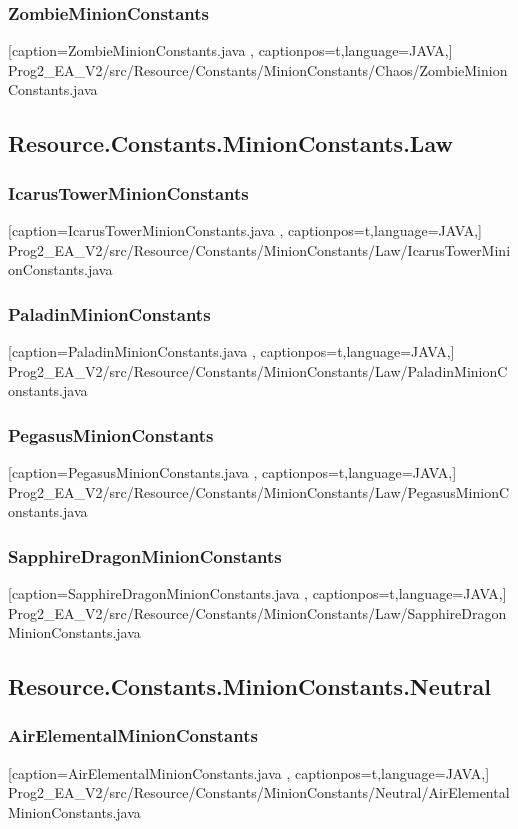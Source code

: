 \documentclass[a4paper,12pt]{scrartcl}
\begin{document}
	\subsubsection{ZombieMinionConstants}
	
	[caption={ZombieMinionConstants.java}
	\label{lst:javaclass},
	captionpos=t,language=JAVA,]
	{Prog2_EA_V2/src/Resource/Constants/MinionConstants/Chaos/ZombieMinionConstants.java}
	\subsection{Resource.Constants.MinionConstants.Law}
	\subsubsection{IcarusTowerMinionConstants}
	
	[caption={IcarusTowerMinionConstants.java}
	\label{lst:javaclass},
	captionpos=t,language=JAVA,]
	{Prog2_EA_V2/src/Resource/Constants/MinionConstants/Law/IcarusTowerMinionConstants.java}
	\subsubsection{PaladinMinionConstants}
	
	[caption={PaladinMinionConstants.java}
	\label{lst:javaclass},
	captionpos=t,language=JAVA,]
	{Prog2_EA_V2/src/Resource/Constants/MinionConstants/Law/PaladinMinionConstants.java}
	\subsubsection{PegasusMinionConstants}
	
	[caption={PegasusMinionConstants.java}
	\label{lst:javaclass},
	captionpos=t,language=JAVA,]
	{Prog2_EA_V2/src/Resource/Constants/MinionConstants/Law/PegasusMinionConstants.java}
	\subsubsection{SapphireDragonMinionConstants}
	
	[caption={SapphireDragonMinionConstants.java}
	\label{lst:javaclass},
	captionpos=t,language=JAVA,]
	{Prog2_EA_V2/src/Resource/Constants/MinionConstants/Law/SapphireDragonMinionConstants.java}
	\subsection{Resource.Constants.MinionConstants.Neutral}
	\subsubsection{AirElementalMinionConstants}
	
	[caption={AirElementalMinionConstants.java}
	\label{lst:javaclass},
	captionpos=t,language=JAVA,]
	{Prog2_EA_V2/src/Resource/Constants/MinionConstants/Neutral/AirElementalMinionConstants.java}
\end{document}
